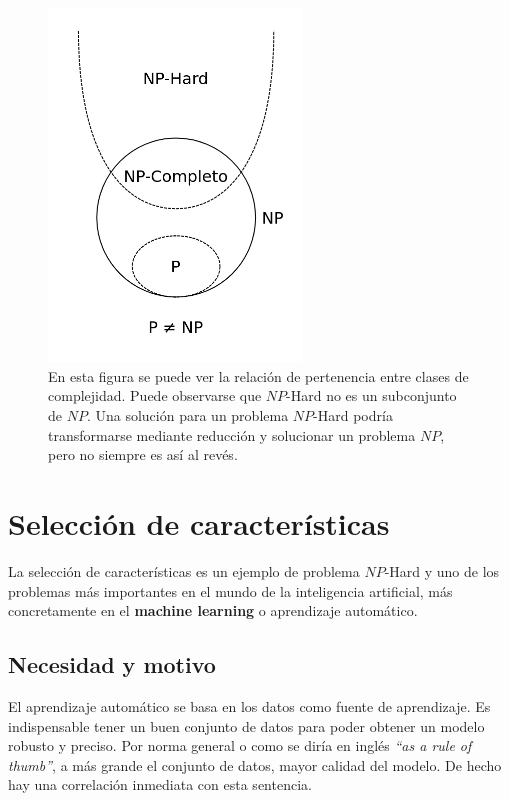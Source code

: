 \begin{figure}[H]
    \begin{center}
        \includegraphics[width=0.6\textwidth]{imagenes/np_subsets.png}
    \end{center}
    \caption[Relación entre clases de complejidad]{En esta figura se puede ver la relación de pertenencia entre clases de complejidad. Puede observarse que $NP$-Hard no es un subconjunto de $NP$. Una solución para un problema $NP$-Hard podría transformarse mediante reducción y solucionar un problema $NP$, pero no siempre es así al revés.}
\end{figure}

\section{Selección de características}
La selección de características es un ejemplo de problema $NP$-Hard y uno de los problemas más importantes en el mundo de la inteligencia artificial, más concretamente en el \textbf{machine learning} o aprendizaje automático.

\subsection{Necesidad y motivo}
El aprendizaje automático se basa en los datos como fuente de aprendizaje. Es indispensable tener un buen conjunto de datos para poder obtener un modelo robusto y preciso. Por norma general o como se diría en inglés \textit{``as a rule of thumb''}, a más grande el conjunto de datos, mayor calidad del modelo. De hecho hay una correlación inmediata con esta sentencia.

